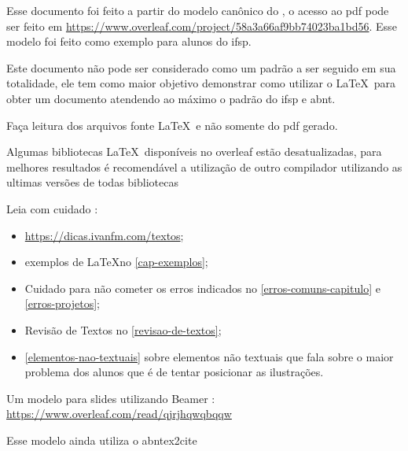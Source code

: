 \newcommand{\urlmodelosimples}{https://www.overleaf.com/project/58a3a66af9bb74023ba1bd56}
\newcommand{\urlmodelo}{\url{\urlmodelosimples}}

\newcommand{\explicacao}[1]{\todo[nolist,inline,color=yellow]{#1}}
\newcommand{\explicacaoErro}[1]{\todo[nolist,inline,color=red]{ERRADO: #1}}

\newcommand{\dicasIvan}[1]{\href{https://dicas.ivanfm.com/404.html?key=#1}{https://dicas.ivanfm.com/#1}}

Esse documento foi feito a partir do modelo canônico do \abnTeX, o acesso ao \acs{pdf} pode ser feito em 
\urlmodelo. Esse modelo foi feito como exemplo para alunos do \ac{ifsp}.

Este documento não pode ser considerado como um padrão a ser seguido em sua totalidade, ele tem como maior objetivo demonstrar como utilizar o \LaTeX\ para obter um documento atendendo ao máximo o padrão do \ac{ifsp} e \ac{abnt}.

Faça leitura dos arquivos fonte \LaTeX\ e não somente do \acs{pdf} gerado.

Algumas bibliotecas \LaTeX\ disponíveis no overleaf estão desatualizadas, para melhores resultados é recomendável a utilização de outro compilador utilizando as ultimas versões de todas bibliotecas

Leia com cuidado :
\begin{itemize}
    \item \dicasIvan{textos};
    
    \item exemplos de \LaTeX \space no \autoref{cap-exemplos};

    \item Cuidado para não cometer os erros indicados no \autoref{erros-comuns-capitulo} e \autoref{erros-projetos};
    
    \item Revisão de Textos no \autoref{revisao-de-textos};

    \item \autoref{elementos-nao-textuais} sobre elementos não textuais que fala sobre o maior problema dos alunos que é de tentar posicionar as ilustrações.
\end{itemize}

Um modelo para slides utilizando Beamer : \url{https://www.overleaf.com/read/qjrjhqwqbqqw}


Esse modelo ainda utiliza o abntex2cite


\noindent\hrulefill

\newpage

